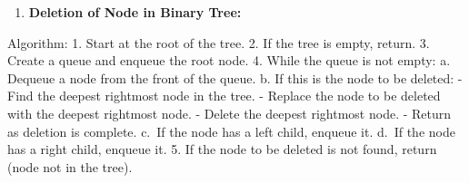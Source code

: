 \begin{Shaded}
\begin{Highlighting}[]
\end{Highlighting}
\end{Shaded}

\begin{enumerate}
\def\labelenumi{\arabic{enumi}.}
\setcounter{enumi}{1}
\tightlist
\item
  \textbf{Deletion of Node in Binary Tree:}
\end{enumerate}

Algorithm: 1. Start at the root of the tree. 2. If the tree is empty,
return. 3. Create a queue and enqueue the root node. 4. While the queue
is not empty: a. Dequeue a node from the front of the queue. b. If this
is the node to be deleted: - Find the deepest rightmost node in the
tree. - Replace the node to be deleted with the deepest rightmost node.
- Delete the deepest rightmost node. - Return as deletion is complete.
c.~If the node has a left child, enqueue it. d.~If the node has a right
child, enqueue it. 5. If the node to be deleted is not found, return
(node not in the tree).

